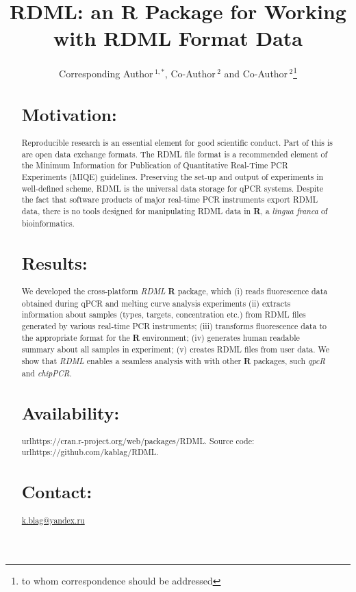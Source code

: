 \documentclass{bioinfo}
\begin{document}
	
	\title[RDML]{RDML: an \textbf{R} Package for Working with RDML Format Data}
	\author[Sample \textit{et~al}]{Corresponding Author\,$^{1,*}$, Co-Author\,$^{2}$
		and Co-Author\,$^2$\footnote{to whom correspondence should be addressed}}
	\address{$^{1}$Department of XXXXXXX, Address XXXX etc.\\ $^{2}$Department of
		XXXXXXXX, Address XXXX etc.}
	
	
	
	\maketitle
	
	\begin{abstract}
		
		\section{Motivation:} Reproducible research is an essential 
		element for good scientific conduct. Part of this is are open data exchange 
		formats. The RDML file format is a recommended element of the Minimum 
		Information for Publication of Quantitative Real-Time PCR Experiments (MIQE) 
		guidelines. Preserving the set-up and output of experiments in well-defined 
		scheme, RDML is the universal data storage for qPCR systems. Despite the fact 
		that software products of major real-time PCR instruments export RDML data, 
		there is no tools designed for manipulating RDML data in \textbf{R}, a 
		\textit{lingua franca} of bioinformatics.
		
		\section{Results:} We developed the cross-platform
		\textit{RDML} \textbf{R} package, which (i) reads fluorescence data obtained 
		during qPCR and melting curve analysis experiments (ii) extracts information 
		about samples (types, targets, concentration etc.) from RDML files generated by 
		various real-time PCR instruments; (iii) transforms fluorescence data to the 
		appropriate format for the \textbf{R} environment; (iv) generates human readable 
		summary about all samples in experiment; (v) creates RDML files from user data. 
		We show that \textit{RDML} enables a seamless analysis with with other 
		\textbf{R} packages, such \textit{qpcR} and \textit{chipPCR}.

		\section{Availability:}
		url{https://cran.r-project.org/web/packages/RDML}. Source code:
		url{https://github.com/kablag/RDML}. \section{Contact:}
		\href{k.blag@yandex.ru}{k.blag@yandex.ru} \end{abstract}
	
\end{document}
